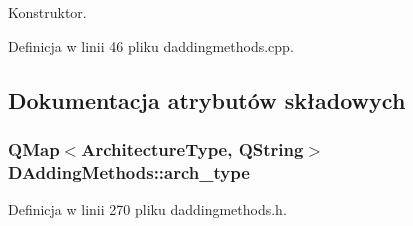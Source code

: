 Konstruktor. 



Definicja w linii 46 pliku daddingmethods.\-cpp.



\subsection{Dokumentacja atrybutów składowych}
\hypertarget{class_d_adding_methods_aa368755d8aba57f3a92877d1fbe925b3}{
\subsubsection[{arch\-\_\-type}]{\setlength{\rightskip}{0pt plus 5cm}Q\-Map$<${\bf Architecture\-Type}, Q\-String$>$ D\-Adding\-Methods\-::arch\-\_\-type\hspace{0.3cm}{\ttfamily [protected]}}}\label{class_d_adding_methods_aa368755d8aba57f3a92877d1fbe925b3}


Definicja w linii 270 pliku daddingmethods.\-h.

